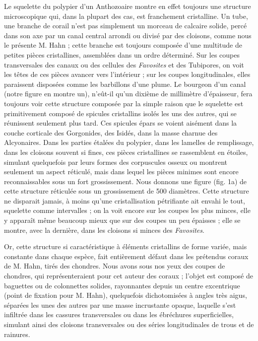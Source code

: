 \documentclass[a4paper, 12pt, oneside, french]{book}
\begin{document}
Le squelette du polypier d'un Anthozoaire montre en effet toujours une structure microscopique qui, dans la plupart des cas, est franchement cristalline. Un tube, une branche de corail n'est pas simplement un morceau de calcaire solide, percé dans son axe par un canal central arrondi ou divisé par des cloisons, comme nous le présente M. Hahn ; cette branche est toujours composée d'une multitude de petites pièces cristallines, assemblées dans un ordre déterminé. Sur les coupes transversales des canaux ou des cellules des \emph{Favosites} et des Tubipores, on voit les têtes de ces pièces avancer vers l'intérieur ; sur les coupes longitudinales, elles paraissent disposées comme les barbillons d'une plume. Le bourgeon d'un canal (notre figure en montre un), n'eût-il qu'un dixième de millimètre d'épaisseur, fera toujours voir cette structure composée par la simple raison que le squelette est primitivement composé de spicules cristallins isolés les uns des autres, qui se réunissent seulement plus tard. Ces spicules épars se voient aisément dans la couche corticale des Gorgonides, des Isidés, dans la masse charnue des Alcyonaires. Dans les parties étalées du polypier, dans les lamelles de remplissage, dans les cloisons souvent si fines, ces pièces cristallines se rassemblent en étoiles, simulant quelquefois par leurs formes des corpuscules osseux ou montrent seulement un aspect réticulé, mais dans lequel les pièces minimes sont encore reconnaissables sous un fort grossissement. Nous donnons une figure (fig. 1a) de cette structure réticulée sous un grossissement de 500 diamètres. Cette structure ne disparait jamais, à moins qu'une cristallisation pétrifiante ait envahi le tout, squelette comme intervalles ; on la voit encore sur les coupes les plus minces, elle y apparaît même beaucoup mieux que sur des coupes un peu épaisses ; elle se montre, avec la dernière, dans les cloisons si minces des \emph{Favosites}.

Or, cette structure si caractéristique à éléments cristallins de forme variée, mais constante dans chaque espèce, fait entièrement défaut dans les prétendus coraux de M. Hahn, tirés des chondres. Nous avons sous nos yeux des coupes de chondres, qui représenteraient pour cet auteur des coraux ; l'objet est composé de baguettes ou de colonnettes solides, rayonnantes depuis un centre excentrique (point de fixation pour M. Hahn), quelquefois dichotomisées à angles très aigus, séparées les unes des autres par une masse incrustante opaque, laquelle s'est infiltrée dans les cassures transversales ou dans les ébréchures superficielles, simulant ainsi des cloisons transversales ou des séries longitudinales de trous et de rainures.
\end{document}
